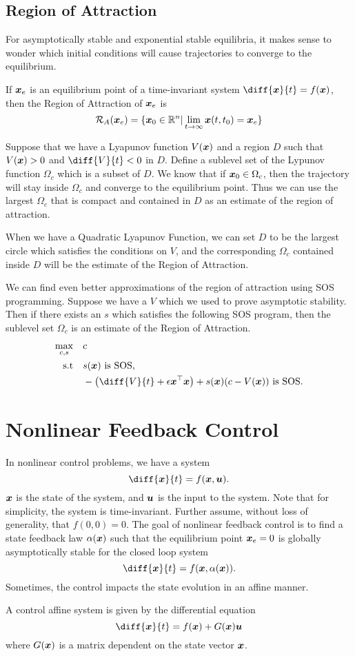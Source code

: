 \subsection{Region of Attraction}
For asymptotically stable and exponential stable equilibria, it makes sense to
wonder which initial conditions will cause trajectories to converge to the
equilibrium.
\begin{definition}
	If $\boldsymbol{x}_e$ is an equilibrium point of a time-invariant system $\diff{\bs{x}}{t}
	= f(\bs{x})$, then the Region of Attraction of $\boldsymbol{x}_e$ is \[
		\mathcal{R}_A(\boldsymbol{x}_e) = \{ \boldsymbol{x}_0 \in \mathbb{R}^n | \lim_{t\to\infty}
		\boldsymbol{x}(t, t_0) = \boldsymbol{x}_e \}
	\]
	\label{defn:region-of-attraction}
\end{definition}
Suppose that we have a Lyapunov function $V(\boldsymbol{x})$ and a region $D$ such that
$V(\boldsymbol{x}) > 0$ and $\diff{V}{t} < 0$ in $D$. Define a sublevel set of the
Lypunov function $\Omega_c$ which is a subset of $D$. We know that if
$\boldsymbol{x}_0\in\Omega_c$, then the trajectory will stay inside $\Omega_c$ and
converge to the equilibrium point. Thus we can use the largest $\Omega_c$ that
is compact and contained in $D$ as an estimate of the region of attraction.

When we have a Quadratic Lyapunov Function, we can set $D$ to be the largest
circle which satisfies the conditions on $V$, and the corresponding $\Omega_c$
contained inside $D$ will be the estimate of the Region of Attraction.

We can find even better approximations of the region of attraction using SOS
programming. Suppose we have a $V$ which we used to prove asymptotic stability.
Then if there exists an $s$ which satisfies the following SOS program, then the
sublevel set $\Omega_c$ is an estimate of the Region of Attraction.
\begin{align*}
	\max_{c, s} &\quad c\\
	\text{s.t} &\quad s(\bs{x}) \text{ is SOS,}\\
	&\quad -\left(\diff{V}{t} + \epsilon \bs{x}^\top \bs{x}\right) + s(\bs{x})(c -
	V(\bs{x})) \text{ is SOS.}
\end{align*}
\section{Nonlinear Feedback Control}
In nonlinear control problems, we have a system \[
	\diff{\bs{x}}{t} = f(\bs{x}, \bs{u}).
\]
$\boldsymbol{x}$ is the state of the system, and $\boldsymbol{u}$ is the input to the system.
Note that for simplicity, the system is time-invariant. Further assume, without
loss of generality, that $f(0, 0) = 0$. The goal of nonlinear feedback control
is to find a state feedback law $\alpha(\boldsymbol{x})$ such that the equilibrium point
$\boldsymbol{x}_e = 0$ is globally asymptotically stable for the closed loop system \[
	\diff{\bs{x}}{t} = f(\bs{x}, \alpha(\bs{x})).
\]
Sometimes, the control impacts the state evolution in an affine manner.
\begin{definition}
	A control affine system is given by the differential equation \[
		\diff{\bs{x}}{t} = f(\bs{x}) + G(\bs{x})\bs{u}
	\] where $G(\boldsymbol{x})$ is a matrix dependent on the state vector $\boldsymbol{x}$.
	\label{defn:control-affine}
\end{definition}

